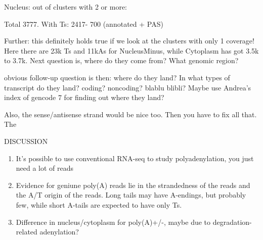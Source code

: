 \documentclass[a4paper]{article}
\begin{document}
Nucleus: out of clusters with 2 or more:

Total 3777. With Ts: 2417- 700 (annotated + PAS)

Further: this definitely holds true if we look at the clusters with only 1
coverage! Here there are 23k Ts and 11kAs for NucleusMinus, while Cytoplasm has
got 3.5k to 3.7k. Next question is, where do they come from? What genomic
region?

obvious follow-up question is then: where do they land? In what types of
transcript do they land? coding? noncoding? blablu blibli? Maybe use Andrea's
index of gencode 7 for finding out where they land?

Also, the sense/antisense strand would be nice too. Then you have to fix all
that.
The

%


DISCUSSION

\begin{enumerate}
	\item It's possible to use conventional RNA-seq to study polyadenylation,
		you just need a lot of reads
	\item Evidence for geniune poly(A) reads lie in the strandedness of the
		reads and the A/T origin of the reads. Long tails may have A-endings,
		but probably few, while short A-tails are expected to have only Ts.
	\item Difference in nucleus/cytoplasm for poly(A)+/-, maybe due to
		degradation-related adenylation? 

\end{enumerate}



%
\end{document}
